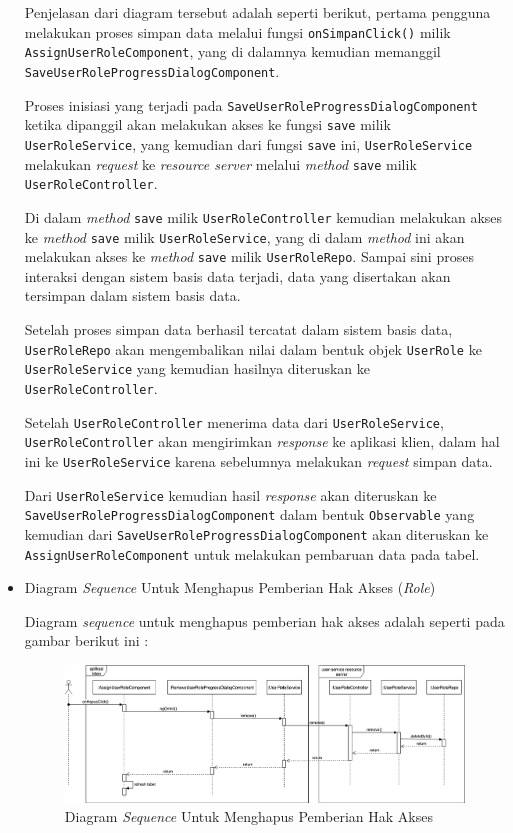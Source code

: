 \documentclass[pdftex,12pt, oneside]{article}
\begin{document}
\begin{itemize}
	Penjelasan dari diagram tersebut adalah seperti berikut, pertama pengguna melakukan proses simpan data melalui fungsi \texttt{onSimpanClick()} milik \texttt{AssignUserRoleComponent}, yang di dalamnya kemudian memanggil \texttt{SaveUserRoleProgressDialogComponent}. 
	
	Proses inisiasi yang terjadi pada \texttt{SaveUserRoleProgressDialogComponent} ketika dipanggil akan melakukan akses ke fungsi \texttt{save} milik \texttt{UserRoleService}, yang kemudian dari fungsi \texttt{save} ini, \texttt{UserRoleService} melakukan \textit{request} ke \textit{resource server} melalui \textit{method} \texttt{save} milik \texttt{UserRoleController}.
	
	Di dalam \textit{method} \texttt{save} milik \texttt{UserRoleController} kemudian melakukan akses ke \textit{method} \texttt{save} milik \texttt{UserRoleService}, yang di dalam \textit{method} ini akan melakukan akses ke \textit{method} \texttt{save} milik \texttt{UserRoleRepo}. Sampai sini proses interaksi dengan sistem basis data terjadi, data yang disertakan akan tersimpan dalam sistem basis data.
	
	Setelah proses simpan data berhasil tercatat dalam sistem basis data, \texttt{UserRoleRepo} akan mengembalikan nilai dalam bentuk objek \texttt{UserRole} ke \texttt{UserRoleService} yang kemudian hasilnya diteruskan ke \texttt{UserRoleController}.
	
	Setelah \texttt{UserRoleController} menerima data dari \texttt{UserRoleService}, \texttt{UserRoleController} akan mengirimkan \textit{response} ke aplikasi klien, dalam hal ini ke \texttt{UserRoleService} karena sebelumnya melakukan \textit{request} simpan data.
	
	Dari \texttt{UserRoleService} kemudian hasil \textit{response} akan diteruskan ke \texttt{SaveUserRoleProgressDialogComponent} dalam bentuk \texttt{Observable} yang kemudian dari \texttt{SaveUserRoleProgressDialogComponent} akan diteruskan ke \texttt{AssignUserRoleComponent} untuk melakukan pembaruan data pada tabel.
	
	\item Diagram \textit{Sequence} Untuk Menghapus Pemberian Hak Akses (\textit{Role})
	
	Diagram \textit{sequence} untuk menghapus pemberian hak akses adalah seperti pada gambar berikut ini :
	
	\begin{figure}[H]
		\centering
		\includegraphics[width=1\textwidth]{./resources/seq-del-user-role}
		\caption{Diagram \textit{Sequence} Untuk Menghapus Pemberian Hak Akses}
		\label{fig:seq-del-user-role}
	\end{figure}
	

\end{itemize}
\end{document}
